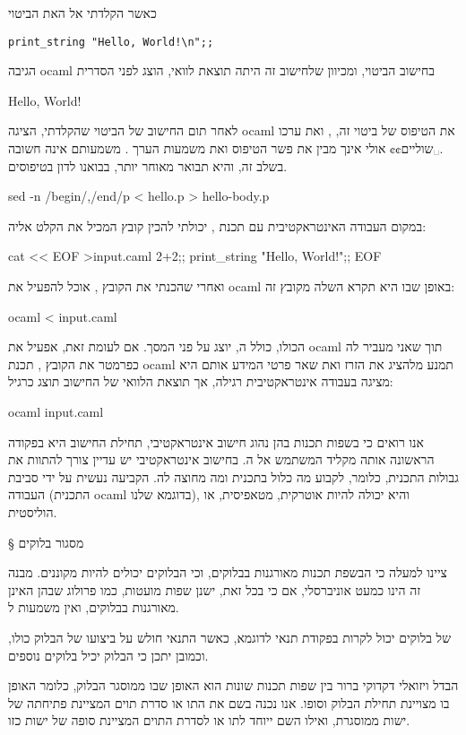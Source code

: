  כאשר הקלדתי אל ה את הביטוי
 \begin{קוד}
 \let\ttfamily=\listingsfont
 \verb+print_string "Hello, World!\n";;+
 \end{קוד}
 הגיבה ocaml בחישוב הביטוי, ומכיוון שלחישוב זה היתה תוצאת לוואי, הוצג לפני
 הסדרית
 \begin{קוד}
 \listingsfont
 Hello, World!
 \end{קוד}
 לאחר תום החישוב של הביטוי שהקלדתי, הציגה ocaml את הטיפוס של ביטוי זה, , ואת ערכו
 .␣שוליים{¢¢
   אולי אינך מבין את פשר הטיפוס  ואת משמעות הערך . משמעותם
 אינה חשובה בשלב זה, והיא תבואר מאוחר יותר, בבואנו לדון בטיפוסים.}

\bash
sed -n /begin/,/end/p < hello.p > hello-body.p
\END

במקום העבודה האינטראקטיבית עם תכנת ,
יכולתי להכין קובץ המכיל את הקלט אליה:
\begin{קוד}
\bash[script]
cat << EOF >input.caml
2+2;;
print_string "Hello, World!\n";;
EOF
\END
\end{קוד}
ואחרי שהכנתי את הקובץ , אוכל להפעיל את ocaml באופן שבו היא תקרא
ה שלה מקובץ זה:
\begin{קוד}
ocaml < input.caml
\END
\end{קוד}
ה כולו, כולל ה, יוצג על פני המסך. אם לעומת זאת, אפעיל את ocaml
תוך שאני מעביר לה כפרמטר את הקובץ , תכנת ocaml תמנע מלהציג
את הזרז ואת שאר פרטי המידע אותם היא מציגה בעבודה אינטראקטיבית רגילה, אך
תוצאת הלוואי של החישוב תוצג כרגיל:
\begin{קוד}
ocaml input.caml
\END
\end{קוד}
אנו רואים כי בשפות תכנות בהן נהוג חישוב אינטראקטיבי, תחילת החישוב היא בפקודה
הראשונה אותה מקליד המשתמש אל ה. בחישוב אינטראקטיבי יש עדיין צורך להתוות את גבולות התכנית,
כלומר, לקבוע מה כלול בתכנית ומה מחוצה לה. הקביעה נעשית על ידי סביבת העבודה (התכנית ocaml
בדוגמא שלנו), והיא יכולה להיות אוטרקית, מטאפיסית, או הוליסטית.

§ מסגור בלוקים

ציינו למעלה כי ה בשפת תכנות מאורגנות בבלוקים, וכי הבלוקים יכולים להיות
מקוננים. מבנה זה הינו כמעט אוניברסלי, אם כי בכל זאת, ישנן שפות מועטות, כמו
פרולוג שבהן ה אינן מאורגנות בבלוקים, ואין משמעות ל.

 של בלוקים יכול לקרות בפקודת תנאי לדוגמא, כאשר התנאי חולש על ביצועו של
הבלוק כולו, וכמובן יתכן כי הבלוק יכיל בלוקים נוספים.

הבדל ויזואלי דקדוקי ברור בין שפות תכנות שונות הוא האופן שבו ממוסגר הבלוק, כלומר
האופן בו מצויינת תחילת הבלוק וסופו. אנו נכנה בשם  את התו או סדרת תוים
המציינת פתיחתה של ישות ממוסגרת, ואילו השם  ייוחד לתו או לסדרת התוים
המציינת סופה של ישות כזו.

